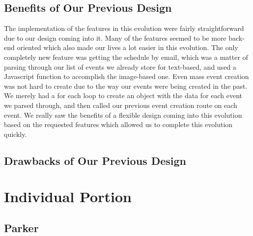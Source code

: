 \documentclass[11pt]{article}   %
\begin{document}
\subsection{Benefits of Our Previous Design}

The implementation of the features in this evolution were fairly straightforward due to our design coming into it. Many of the features seemed to be more back-end oriented which also made our lives a lot easier in this evolution. The only completely new feature was getting the schedule by email, which was a matter of parsing through our list of events we already store for text-based, and used a Javascript function to accomplish the image-based one. Even mass event creation was not hard to create due to the way our events were being created in the past. We merely had a for each loop to create an object with the data for each event we parsed through, and then called our previous event creation route on each event. We really saw the benefits of a flexible design coming into this evolution based on the requested features which allowed us to complete this evolution quickly.

\subsection{Drawbacks of Our Previous Design}

\section{Individual Portion}
\subsection*{Parker}
\end{document}

